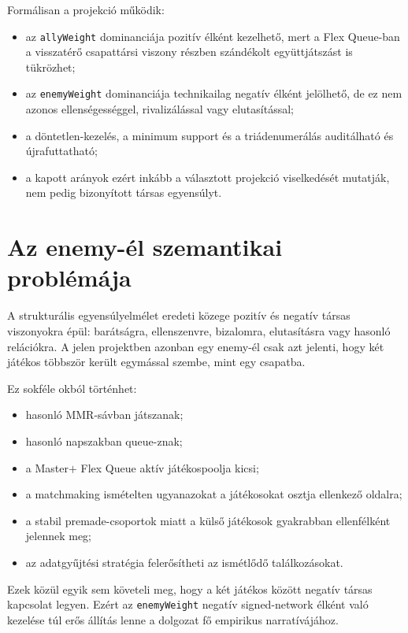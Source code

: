 ﻿\documentclass[a4paper,12pt]{report}
\begin{document}
Formálisan a projekció működik:

\begin{itemize}
    \item az \texttt{allyWeight} dominanciája pozitív élként kezelhető, mert a Flex Queue-ban a visszatérő csapattársi viszony részben szándékolt együttjátszást is tükrözhet;
    \item az \texttt{enemyWeight} dominanciája technikailag negatív élként jelölhető, de ez nem azonos ellenségességgel, rivalizálással vagy elutasítással;
    \item a döntetlen-kezelés, a minimum support és a triádenumerálás auditálható és újrafuttatható;
    \item a kapott arányok ezért inkább a választott projekció viselkedését mutatják, nem pedig bizonyított társas egyensúlyt.
\end{itemize}

\section{Az enemy-él szemantikai problémája}

A strukturális egyensúlyelmélet eredeti közege pozitív és negatív társas viszonyokra épül: barátságra, ellenszenvre, bizalomra, elutasításra vagy hasonló relációkra. A jelen projektben azonban egy enemy-él csak azt jelenti, hogy két játékos többször került egymással szembe, mint egy csapatba.

Ez sokféle okból történhet:

\begin{itemize}
    \item hasonló MMR-sávban játszanak;
    \item hasonló napszakban queue-znak;
    \item a Master$+$ Flex Queue aktív játékospoolja kicsi;
    \item a matchmaking ismételten ugyanazokat a játékosokat osztja ellenkező oldalra;
    \item a stabil premade-csoportok miatt a külső játékosok gyakrabban ellenfélként jelennek meg;
    \item az adatgyűjtési stratégia felerősítheti az ismétlődő találkozásokat.
\end{itemize}

Ezek közül egyik sem követeli meg, hogy a két játékos között negatív társas kapcsolat legyen. Ezért az \texttt{enemyWeight} negatív signed-network élként való kezelése túl erős állítás lenne a dolgozat fő empirikus narratívájához.
\end{document}
